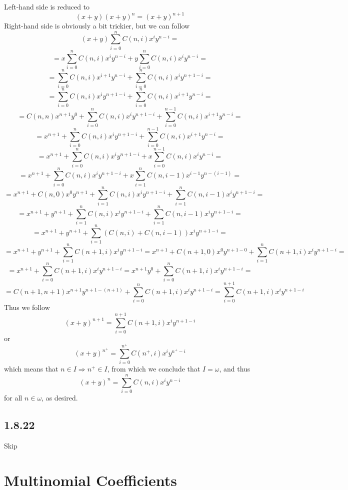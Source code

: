 \documentclass[11pt,oneside,titlepage]{book}
\begin{document}
Left-hand side is reduced to
$$(x + y)(x + y)^n = (x + y)^{n + 1}$$
Right-hand side is obviously a bit trickier, but we can follow
$$
(x + y) \sum_{i = 0}^{n}{C(n, i)x^i y^{n - i}} =
$$
$$ =
x \sum_{i = 0}^{n}{C(n, i)x^{i} y^{n - i}} + y \sum_{i = 0}^{n}{C(n, i)x^i y^{n - i}} =
$$
$$ =
\sum_{i = 0}^{n}{C(n, i)x^{i + 1} y^{n - i}} + \sum_{i = 0}^{n}{C(n, i)x^i y^{n + 1 - i}} =
$$
$$ =
\sum_{i = 0}^{n}{C(n, i)x^i y^{n + 1 - i}} +  \sum_{i = 0}^{n}{C(n, i)x^{i + 1} y^{n - i}} =
$$
$$ =
C(n, n)x^{n + 1}y^0 + \sum_{i = 0}^{n}{C(n, i)x^i y^{n + 1 - i}}
+  \sum_{i = 0}^{n - 1}{C(n, i)x^{i + 1} y^{n - i}} =
$$
$$ =
x^{n + 1} + \sum_{i = 0}^{n}{C(n, i)x^i y^{n + 1 - i}}
+  \sum_{i = 0}^{n - 1}{C(n, i)x^{i + 1} y^{n - i}} =
$$
$$ =
x^{n + 1} + \sum_{i = 0}^{n}{C(n, i)x^i y^{n + 1 - i}}
+ x \sum_{i = 0}^{n - 1}{C(n, i)x^{i} y^{n - i}} =
$$
$$ =
x^{n + 1} + \sum_{i = 0}^{n}{C(n, i)x^i y^{n + 1 - i}}
+ x \sum_{i = 1}^{n}{C(n, i - 1)x^{i - 1} y^{n - (i - 1)}} =
$$
$$ =
x^{n + 1} + C(n, 0)x^0 y^{n + 1}  + \sum_{i = 1}^{n}{C(n, i)x^i y^{n + 1 - i}}
+ \sum_{i = 1}^{n}{C(n, i - 1)x^i y^{n + 1 - i}} =
$$
$$ =
x^{n + 1} + y^{n + 1} + \sum_{i = 1}^{n}{C(n, i)x^i y^{n + 1 - i}}
+ \sum_{i = 1}^{n}{C(n, i - 1)x^i y^{n + 1 - i}} =
$$
$$ = 
 x^{n + 1} + y^{n + 1} + \sum_{i = 1}^{n}{(C(n, i) + C(n, i - 1))x^i y^{n + 1 - i}}  = 
$$
$$
= x^{n + 1} + y^{n + 1} + \sum_{i = 1}^{n}{C(n + 1, i)x^i y^{n + 1 - i}}  
= x^{n + 1} + C(n + 1, 0)x^0 y^{n + 1 - 0} + \sum_{i = 1}^{n}{C(n + 1, i)x^i y^{n + 1 - i}}  =
$$
$$
= x^{n + 1} + \sum_{i = 0}^{n}{C(n + 1, i)x^i y^{n + 1 - i}} 
= x^{n + 1}y^{0} + \sum_{i = 0}^{n}{C(n + 1, i)x^i y^{n + 1 - i}} =  $$
$$ = C(n + 1, n + 1)x^{n + 1}y^{n + 1 - (n + 1)} + \sum_{i = 0}^{n}{C(n + 1, i)x^i y^{n + 1 - i}} 
= \sum_{i = 0}^{n + 1}{C(n + 1, i)x^i y^{n + 1 - i}}$$
Thus we follow
$$(x + y)^{n + 1} = \sum_{i = 0}^{n + 1}{C(n + 1, i)x^i y^{n + 1 - i}}$$
or
$$(x + y)^{n^+} = \sum_{i = 0}^{n^+}{C(n^+, i)x^i y^{n^+ - i}}$$
which means that $n \in I \Rightarrow n^+ \in I$, from which we conclude that $I = \omega$, and
thus 
$$(x + y)^n = \sum_{i = 0}^{n}{C(n, i) x^i y^{n - i}}$$
for all $n \in \omega$, as desired.

\subsection*{1.8.22}

Skip

\section{Multinomial Coefficients}
\end{document}
